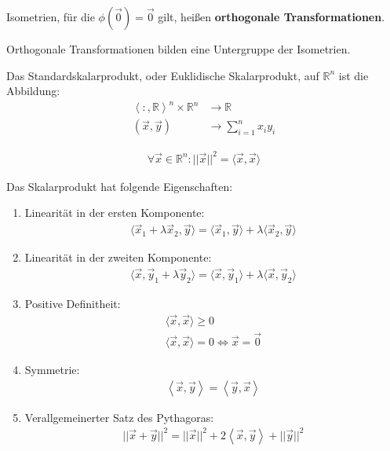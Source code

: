 \documentclass{report}
\newcommand*{\newpar}{\par\vspace{\baselineskip}\noindent}
\newcommand{\tbf}[1]{\textbf{#1}}
\newcommand{\bR}{\mathbb{R}}
\newcommand{\vx}{\vec{x}}
\newcommand{\vy}{\vec{y}}
\newcommand{\vz}{\vec{0}}
\newcommand{\scalar}[2]{\left\langle #1, #2 \right\rangle}
\begin{document}
\begin{definition}
 Isometrien, für die $\phi(\vz) = \vz$ gilt, heißen \tbf{orthogonale Transformationen}. 
\end{definition}
\newpar
Orthogonale Transformationen bilden eine Untergruppe der Isometrien.
\newpar
\begin{definition}
Das Standardskalarprodukt, oder Euklidische Skalarprodukt, auf $\bR^n$ ist die Abbildung:
\begin{align*}
 \scalar : \bR^n \times \bR^n &\to \bR\\
                    (\vx, \vy) &\to \sum_{i=1}^n x_i y_i
\end{align*}
\end{definition}
\begin{anmerkung}
\begin{align*}
 \forall \vx \in \bR^n : ||\vx||^2 = \langle \vx, \vx \rangle
\end{align*}
\end{anmerkung}
\begin{anmerkung}
 Das Skalarprodukt hat folgende Eigenschaften:
 \begin{enumerate}
  \item Linearität in der ersten Komponente:
  \begin{align*}
   \langle \vx_1 + \lambda \vx_2, \vy \rangle = \langle \vx_1, \vy \rangle + \lambda \langle \vx_2, \vy \rangle
  \end{align*}
  \item Linearität in der zweiten Komponente:
  \begin{align*}
   \langle \vx, \vy_1 + \lambda \vy_2 \rangle = \langle \vx, \vy_1 \rangle + \lambda \langle \vx, \vy_2 \rangle
  \end{align*}
  \item Positive Definitheit:
  \begin{align*}
   \langle \vx, \vx \rangle \geq 0\\
   \langle \vx, \vx \rangle = 0 \Leftrightarrow \vx = \vz
  \end{align*}
  \item Symmetrie:
  \begin{align*}
   \scalar{\vx}{\vy} = \scalar{\vy}{\vx}
  \end{align*}
  \item Verallgemeinerter Satz des Pythagoras:
  \begin{align*}
   || \vx + \vy ||^2 = ||\vx||^2 + 2 \scalar{\vx}{\vy} + ||\vy||^2
  \end{align*}

 \end{enumerate}
\end{anmerkung}
\end{document}
